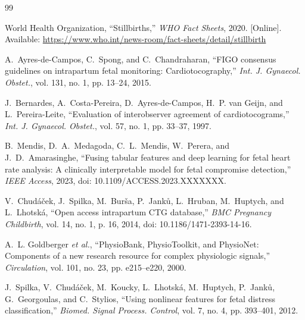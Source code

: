 \documentclass[conference]{IEEEtran}
\begin{document}
% 


\begin{thebibliography}{99}

World Health Organization, ``Stillbirths,'' \textit{WHO Fact Sheets}, 2020.
[Online]. Available: \url{https://www.who.int/news-room/fact-sheets/detail/stillbirth}

A.~Ayres-de-Campos, C.~Spong, and C.~Chandraharan, ``FIGO consensus guidelines on
intrapartum fetal monitoring: Cardiotocography,''
\textit{Int. J. Gynaecol. Obstet.}, vol. 131, no. 1, pp. 13--24, 2015.

J.~Bernardes, A.~Costa-Pereira, D.~Ayres-de-Campos, H.~P. van Geijn, and
L.~Pereira-Leite, ``Evaluation of interobserver agreement of cardiotocograms,''
\textit{Int. J. Gynaecol. Obstet.}, vol. 57, no. 1, pp. 33--37, 1997.

B.~Mendis, D.~A.~Medagoda, C.~L.~Mendis, W.~Perera, and J.~D.~Amarasinghe,
``Fusing tabular features and deep learning for fetal heart rate analysis:
A clinically interpretable model for fetal compromise detection,''
\textit{IEEE Access}, 2023, doi: 10.1109/ACCESS.2023.XXXXXXX.

V.~Chudáček, J.~Spilka, M.~Burša, P.~Janků, L.~Hruban, M.~Huptych,
and L.~Lhotská, ``Open access intrapartum CTG database,''
\textit{BMC Pregnancy Childbirth}, vol. 14, no. 1, p. 16, 2014,
doi: 10.1186/1471-2393-14-16.

A.~L. Goldberger \textit{et al.}, ``PhysioBank, PhysioToolkit, and PhysioNet:
Components of a new research resource for complex physiologic signals,''
\textit{Circulation}, vol. 101, no. 23, pp. e215--e220, 2000.

J.~Spilka, V.~Chudáček, M.~Koucky, L.~Lhotská, M.~Huptych, P.~Janků,
G.~Georgoulas, and C.~Stylios, ``Using nonlinear features for fetal
distress classification,''
\textit{Biomed. Signal Process. Control}, vol. 7, no. 4, pp. 393--401, 2012.


\end{thebibliography}
\end{document}
